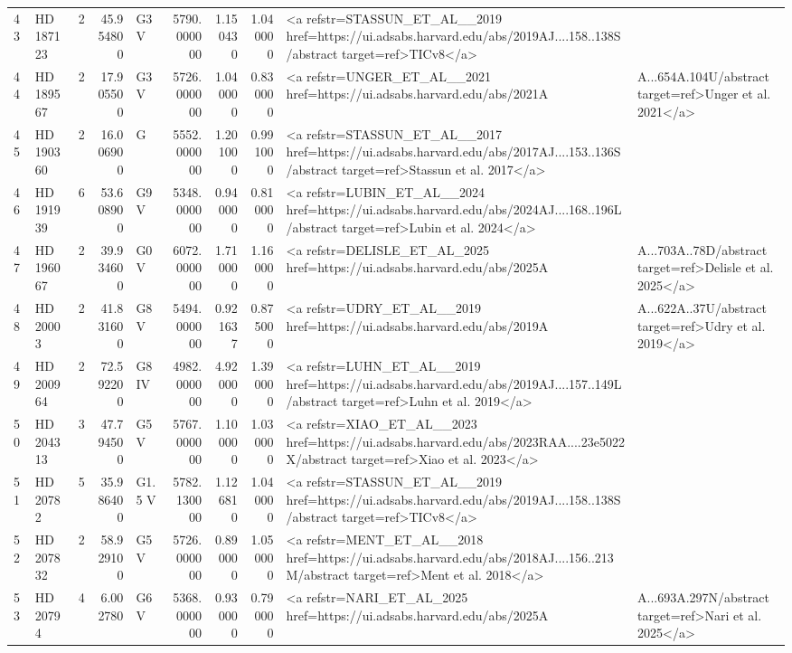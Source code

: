 \begin{tabular}{llrrlrrrl}
43 & HD 187123 & 2 & 45.954800 & G3 V & 5790.000000 & 1.150430 & 1.040000 & <a refstr=STASSUN_ET_AL__2019 href=https://ui.adsabs.harvard.edu/abs/2019AJ....158..138S/abstract target=ref>TICv8</a> \\
44 & HD 189567 & 2 & 17.905500 & G3 V & 5726.000000 & 1.040000 & 0.830000 & <a refstr=UNGER_ET_AL__2021 href=https://ui.adsabs.harvard.edu/abs/2021A&A...654A.104U/abstract target=ref>Unger et al. 2021</a> \\
45 & HD 190360 & 2 & 16.006900 & G & 5552.000000 & 1.201000 & 0.991000 & <a refstr=STASSUN_ET_AL__2017 href=https://ui.adsabs.harvard.edu/abs/2017AJ....153..136S/abstract target=ref>Stassun et al. 2017</a> \\
46 & HD 191939 & 6 & 53.608900 & G9 V & 5348.000000 & 0.940000 & 0.810000 & <a refstr=LUBIN_ET_AL__2024 href=https://ui.adsabs.harvard.edu/abs/2024AJ....168..196L/abstract target=ref>Lubin et al. 2024</a> \\
47 & HD 196067 & 2 & 39.934600 & G0 V & 6072.000000 & 1.710000 & 1.160000 & <a refstr=DELISLE_ET_AL_2025 href=https://ui.adsabs.harvard.edu/abs/2025A&A...703A..78D/abstract target=ref>Delisle et al. 2025</a> \\
48 & HD 20003 & 2 & 41.831600 & G8 V & 5494.000000 & 0.921637 & 0.875000 & <a refstr=UDRY_ET_AL__2019 href=https://ui.adsabs.harvard.edu/abs/2019A&A...622A..37U/abstract target=ref>Udry et al. 2019</a> \\
49 & HD 200964 & 2 & 72.592200 & G8 IV & 4982.000000 & 4.920000 & 1.390000 & <a refstr=LUHN_ET_AL__2019 href=https://ui.adsabs.harvard.edu/abs/2019AJ....157..149L/abstract target=ref>Luhn et al. 2019</a> \\
50 & HD 204313 & 3 & 47.794500 & G5 V & 5767.000000 & 1.100000 & 1.030000 & <a refstr=XIAO_ET_AL__2023 href=https://ui.adsabs.harvard.edu/abs/2023RAA....23e5022X/abstract target=ref>Xiao et al. 2023</a> \\
51 & HD 20782 & 5 & 35.986400 & G1.5 V & 5782.130000 & 1.126810 & 1.040000 & <a refstr=STASSUN_ET_AL__2019 href=https://ui.adsabs.harvard.edu/abs/2019AJ....158..138S/abstract target=ref>TICv8</a> \\
52 & HD 207832 & 2 & 58.929100 & G5 V & 5726.000000 & 0.890000 & 1.050000 & <a refstr=MENT_ET_AL__2018 href=https://ui.adsabs.harvard.edu/abs/2018AJ....156..213M/abstract target=ref>Ment et al. 2018</a> \\
53 & HD 20794 & 4 & 6.002780 & G6 V & 5368.000000 & 0.930000 & 0.790000 & <a refstr=NARI_ET_AL_2025 href=https://ui.adsabs.harvard.edu/abs/2025A&A...693A.297N/abstract target=ref>Nari et al. 2025</a> \\

\end{tabular}
